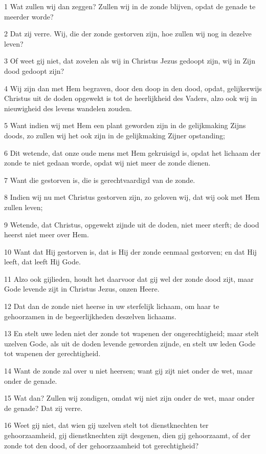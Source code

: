 \par 1 Wat zullen wij dan zeggen? Zullen wij in de zonde blijven, opdat de genade te meerder worde?
\par 2 Dat zij verre. Wij, die der zonde gestorven zijn, hoe zullen wij nog in dezelve leven?
\par 3 Of weet gij niet, dat zovelen als wij in Christus Jezus gedoopt zijn, wij in Zijn dood gedoopt zijn?
\par 4 Wij zijn dan met Hem begraven, door den doop in den dood, opdat, gelijkerwijs Christus uit de doden opgewekt is tot de heerlijkheid des Vaders, alzo ook wij in nieuwigheid des levens wandelen zouden.
\par 5 Want indien wij met Hem een plant geworden zijn in de gelijkmaking Zijns doods, zo zullen wij het ook zijn in de gelijkmaking Zijner opstanding;
\par 6 Dit wetende, dat onze oude mens met Hem gekruisigd is, opdat het lichaam der zonde te niet gedaan worde, opdat wij niet meer de zonde dienen.
\par 7 Want die gestorven is, die is gerechtvaardigd van de zonde.
\par 8 Indien wij nu met Christus gestorven zijn, zo geloven wij, dat wij ook met Hem zullen leven;
\par 9 Wetende, dat Christus, opgewekt zijnde uit de doden, niet meer sterft; de dood heerst niet meer over Hem.
\par 10 Want dat Hij gestorven is, dat is Hij der zonde eenmaal gestorven; en dat Hij leeft, dat leeft Hij Gode.
\par 11 Alzo ook gijlieden, houdt het daarvoor dat gij wel der zonde dood zijt, maar Gode levende zijt in Christus Jezus, onzen Heere.
\par 12 Dat dan de zonde niet heerse in uw sterfelijk lichaam, om haar te gehoorzamen in de begeerlijkheden deszelven lichaams.
\par 13 En stelt uwe leden niet der zonde tot wapenen der ongerechtigheid; maar stelt uzelven Gode, als uit de doden levende geworden zijnde, en stelt uw leden Gode tot wapenen der gerechtigheid.
\par 14 Want de zonde zal over u niet heersen; want gij zijt niet onder de wet, maar onder de genade.
\par 15 Wat dan? Zullen wij zondigen, omdat wij niet zijn onder de wet, maar onder de genade? Dat zij verre.
\par 16 Weet gij niet, dat wien gij uzelven stelt tot dienstknechten ter gehoorzaamheid, gij dienstknechten zijt desgenen, dien gij gehoorzaamt, of der zonde tot den dood, of der gehoorzaamheid tot gerechtigheid?
